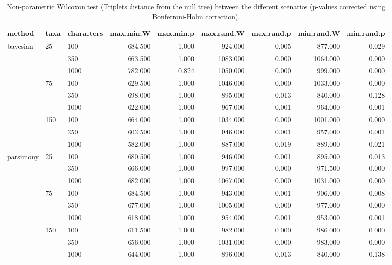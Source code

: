 \begin{table}[ht]
\centering
\begin{tabular}{lllrrrrrr}
  \hline
method & taxa & characters & max.min.W & max.min.p & max.rand.W & max.rand.p & min.rand.W & min.rand.p \\ 
  \hline
bayesian & 25 & 100 & 684.500 & 1.000 & 924.000 & 0.005 & 877.000 & 0.029 \\ 
   &  & 350 & 663.500 & 1.000 & 1083.000 & 0.000 & 1064.000 & 0.000 \\ 
   &  & 1000 & 782.000 & 0.824 & 1050.000 & 0.000 & 999.000 & 0.000 \\ 
   & 75 & 100 & 629.500 & 1.000 & 1046.000 & 0.000 & 1033.000 & 0.000 \\ 
   &  & 350 & 698.000 & 1.000 & 895.000 & 0.013 & 840.000 & 0.128 \\ 
   &  & 1000 & 622.000 & 1.000 & 967.000 & 0.001 & 964.000 & 0.001 \\ 
   & 150 & 100 & 664.000 & 1.000 & 1034.000 & 0.000 & 1001.000 & 0.000 \\ 
   &  & 350 & 603.500 & 1.000 & 946.000 & 0.001 & 957.000 & 0.001 \\ 
   &  & 1000 & 582.000 & 1.000 & 887.000 & 0.019 & 889.000 & 0.021 \\ 
  parsimony & 25 & 100 & 680.500 & 1.000 & 946.000 & 0.001 & 895.000 & 0.013 \\ 
   &  & 350 & 666.000 & 1.000 & 997.000 & 0.000 & 971.500 & 0.000 \\ 
   &  & 1000 & 682.000 & 1.000 & 1067.000 & 0.000 & 1031.000 & 0.000 \\ 
   & 75 & 100 & 684.500 & 1.000 & 943.000 & 0.001 & 906.000 & 0.008 \\ 
   &  & 350 & 677.000 & 1.000 & 1005.000 & 0.000 & 977.000 & 0.000 \\ 
   &  & 1000 & 618.000 & 1.000 & 954.000 & 0.001 & 953.000 & 0.001 \\ 
   & 150 & 100 & 611.500 & 1.000 & 982.000 & 0.000 & 986.000 & 0.000 \\ 
   &  & 350 & 656.000 & 1.000 & 1031.000 & 0.000 & 983.000 & 0.000 \\ 
   &  & 1000 & 644.000 & 1.000 & 896.000 & 0.013 & 840.000 & 0.138 \\ 
   \hline
\end{tabular}
\caption{Non-parametric Wilcoxon test (Triplets distance from the null tree) between the different scenarios (p-values corrected using Bonferroni-Holm correction).} 
\label{Full_Tab_BCTrnull}
\end{table}
